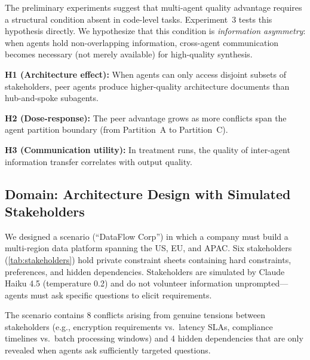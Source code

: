 \documentclass[11pt,letterpaper]{article}
\begin{document}
The preliminary experiments suggest that multi-agent quality advantage
requires a structural condition absent in code-level tasks.
Experiment~3 tests this hypothesis directly. We
hypothesize that this condition is \emph{information asymmetry}: when
agents hold non-overlapping information, cross-agent communication
becomes necessary (not merely available) for high-quality synthesis.

\textbf{H1 (Architecture effect):} When agents can only access disjoint
subsets of stakeholders, peer agents produce higher-quality architecture
documents than hub-and-spoke subagents.

\textbf{H2 (Dose-response):} The peer advantage grows as more conflicts
span the agent partition boundary (from Partition~A to Partition~C).

\textbf{H3 (Communication utility):} In treatment runs, the quality of
inter-agent information transfer correlates with output quality.

\subsection{Domain: Architecture Design with Simulated Stakeholders}

We designed a scenario (``DataFlow Corp'') in which a company must build
a multi-region data platform spanning the US, EU, and APAC. Six
stakeholders (\cref{tab:stakeholders}) hold private constraint sheets
containing hard constraints, preferences, and hidden dependencies. Stakeholders are simulated by
Claude Haiku 4.5 (temperature 0.2) and do not volunteer information
unprompted---agents must ask specific questions to elicit requirements.

The scenario contains 8 conflicts arising from genuine tensions between
stakeholders (e.g., encryption requirements vs.\ latency SLAs,
compliance timelines vs.\ batch processing windows) and 4 hidden
dependencies that are only revealed when agents ask sufficiently
targeted questions.
\end{document}
